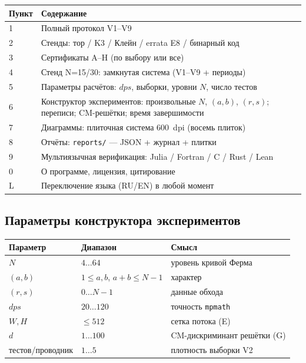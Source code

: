 \begin{center}
\small
\begin{tabularx}{\textwidth}{@{}l >{\raggedright\arraybackslash}X@{}}
\toprule
Пункт & Содержание \\
\midrule
1 & Полный протокол V1--V9 \\
2 & Стенды: тор / K3 / Клейн / errata E8 / бинарный код \\
3 & Сертификаты A--H (по выбору или все) \\
4 & Стенд N=15/30: замкнутая система (V1--V9 + периоды) \\
5 & Параметры расчётов: $dps$, выборки, уровни $N$, число тестов \\
6 & Конструктор экспериментов: произвольные $N$, $(a,b)$,
  $(r,s)$; переписи; CM-решётки; время завершимости \\
7 & Диаграммы: плиточная система $600$~dpi (восемь плиток) \\
8 & Отчёты: \texttt{reports/} --- JSON + журнал + плитки \\
9 & Мультиязычная верификация: Julia / Fortran / C / Rust / Lean \\
0 & О программе, лицензия, цитирование \\
L & Переключение языка (RU/EN) в любой момент \\
\bottomrule
\end{tabularx}
\end{center}

\subsection{Параметры конструктора экспериментов}

\begin{center}
\small
\begin{tabularx}{\textwidth}{@{}l l >{\raggedright\arraybackslash}X@{}}
\toprule
Параметр & Диапазон & Смысл \\
\midrule
$N$ & $4\dots64$ & уровень кривой Ферма \\
$(a,b)$ & $1\le a,b$, $a+b\le N-1$ & характер \\
$(r,s)$ & $0\dots N-1$ & данные обхода \\
$dps$ & $20\dots120$ & точность \texttt{mpmath} \\
$W,H$ & $\le 512$ & сетка потока (E) \\
$d$ & $1\dots100$ & CM-дискриминант решётки (G) \\
тестов/проводник & $1\dots5$ & плотность выборки V2 \\
\bottomrule
\end{tabularx}
\end{center}

